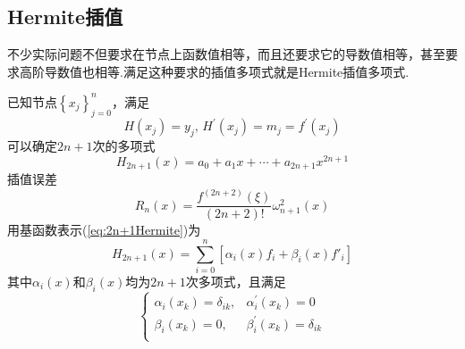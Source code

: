 \subsection{Hermite插值}
不少实际问题不但要求在节点上函数值相等，而且还要求它的导数值相等，甚至要求高阶导数值也相等.满足这种要求的插值多项式就是Hermite插值多项式.

已知节点$\left\{ x_{j} \right\}_{j = 0}^{n}$，满足
\[
    H(x_j) = y_{j},\,H^{\prime}(x_{j}) = m_{j} = f^{\prime}(x_{j})
\]
可以确定$2n+1$次的多项式
\begin{equation}\label{eq:2n+1Hermite}
    H_{2n+1}(x) = a_0+a_1x+\cdots+a_{2n+1}x^{2n+1}
\end{equation}
插值误差
\[
    R_{n}(x)  =\dfrac{f^{(2n+2)}(\xi)}{(2n+2)!}\omega_{n+1}^2(x)
\]
用基函数表示(\ref{eq:2n+1Hermite})为
\[
    H_{2n+1}(x) = \sum\limits_{i = 0}^{n}\left[ \alpha_{i}(x)f_{i}+\beta_{i}(x)f'_{i} \right]
\]
其中$\alpha_{i}(x)$和$\beta_{i}(x)$均为$2n+1$次多项式，且满足
\begin{equation}\label{eq:constrainHermit}
    \left\{
        \begin{array}{ll}
            \alpha_{i}(x_k) = \delta_{ik}, & \alpha_{i}^{\prime}(x_k) = 0\\
            \beta_{i}(x_k) = 0, & \beta_{i}^{\prime}(x_k) = \delta_{ik}\\
        \end{array}
    \right.
\end{equation}
